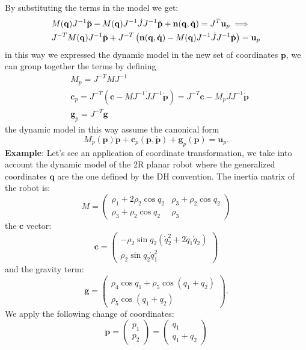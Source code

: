 \documentclass[10pt, a4paper]{report}
\newcommand{\q}{{\mathbf q}}
\begin{document}
By substituting the terms in the model we get:\begin{align}
   & M(\q)J^{-1}\ddot{\mathbf p}-M(\q)J^{-1}\dot JJ^{-1}\dot{\mathbf p}+\mathbf n(\q,\dq)=J^T\mathbf u_p\implies\\
   &J^{-T}M(\q)J^{-1}\ddot{\mathbf p}+J^{-T}\left(\mathbf n(\q,\dq)-M(\q)J^{-1}\dot JJ^{-1}\dot{\mathbf p}\right)=\mathbf u_p
\end{align}
in this way we expressed the dynamic model in the new set of coordinates $\mathbf p$, we can group together the terms by defining\begin{align}
    &M_p=J^{-T}MJ^{-1}\\
    &\mathbf c_p=J^{-T}(\mathbf c-MJ^{-1}\dot JJ^{-1}\dot{\mathbf p})=J^{-T}\mathbf c-M_p\dot JJ^{-1}\dot{\mathbf p}\\
    &\mathbf g_p=J^{-T}\mathbf g
\end{align}
the dynamic model in this way assume the canonical form\begin{equation}
    M_p(\mathbf p)\ddot{\mathbf p}+\mathbf c_p(\mathbf p,\dot{\mathbf p})+\mathbf g_p(\mathbf p)=\mathbf u_p.
\end{equation}
\textbf{Example}: Let's see an application of coordinate transformation, we take into account the dynamic model of the 2R planar robot where the generalized coordinates $\q$ are the one defined by the DH convention. The inertia matrix of the robot is:\begin{equation}
    M=\begin{pmatrix}
        \rho_1+2\rho_2\cos q_2&\rho_3+\rho_2\cos q_2\\ 
        \rho_3+\rho_2\cos q_2&\rho_3
    \end{pmatrix}
\end{equation}
the $\mathbf c$ vector:\begin{equation}
    \mathbf c=\begin{pmatrix}
        -\rho_2\sin q_2(\dot q_2^2+2\dot q_1\dot q_2)\\ 
        \rho_2\sin q_2\dot q_1^2
    \end{pmatrix}
\end{equation}
and the gravity term:\begin{equation}
   \mathbf g= \begin{pmatrix}
    \rho_4\cos q_1+\rho_5 \cos (q_1+q_2)\\ \rho_5 \cos (q_1+q_2)
    \end{pmatrix}.
\end{equation}
We apply the following change of coordinates:\begin{equation}
    \mathbf p=\begin{pmatrix}
        p_1\\p_2
    \end{pmatrix}=\begin{pmatrix}
        q_1\\q_1+q_2
    \end{pmatrix}
\end{equation}
\end{document}
